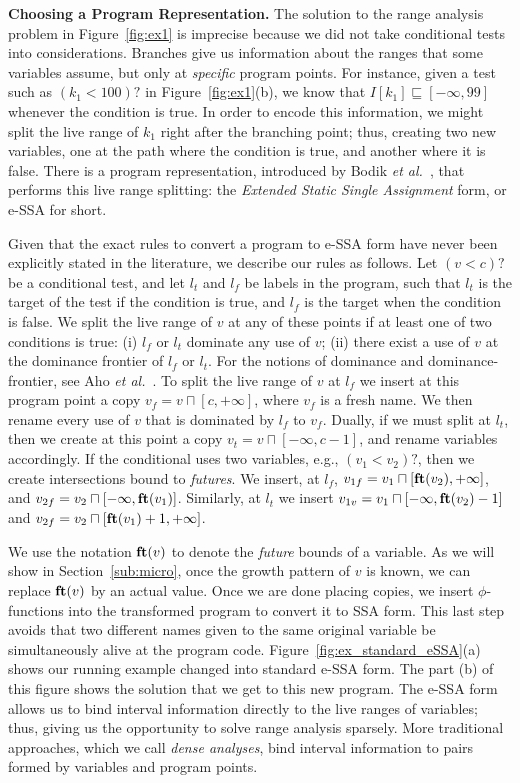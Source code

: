 \documentclass{llncs}
\newcommand{\fun}[1]{\mbox{\textbf{#1}}}
\begin{document}
\noindent
\textbf{Choosing a Program Representation.}
The solution to the range analysis problem in Figure~\ref{fig:ex1}
is imprecise because we did not take conditional tests into considerations.
Branches give us information about the ranges that some variables assume, but
only at {\em specific} program points.
For instance, given a test such as $(k_1 < 100)?$ in  Figure~\ref{fig:ex1}(b),
we know that $I[k_1] \sqsubseteq [-\infty, 99]$ whenever the condition is true.
In order to encode this information, we might split the live range of $k_1$
right after the branching point; thus, creating two new variables, one at the
path where the condition is true, and another where it is false.
There is a program representation, introduced by Bodik
{\em et al.}~\cite{Bodik00}, that performs this live range splitting:
the {\em Extended Static Single Assignment} form, or e-SSA for short.

Given that the exact rules to convert a program to e-SSA form have never been
explicitly stated in the literature, we describe our rules as follows.
Let $(v < c)?$ be a conditional test, and let $l_t$ and $l_f$ be labels in
the program, such that $l_t$ is the target of the test if the condition is true,
and $l_f$ is the target when the condition is false.
We split the live range of $v$ at any of these points if at least one of two
conditions is true:
(i) $l_f$ or $l_t$ dominate any use of $v$;
(ii) there exist a use of $v$ at the dominance frontier of $l_f$ or $l_t$.
For the notions of dominance and dominance-frontier, see Aho
{\em et al.}~\cite{Aho06}.
To split the live range of $v$ at $l_f$ we insert at this
program point a copy $v_f = v \sqcap [c, +\infty]$, where $v_f$ is a fresh name.
We then rename every use of $v$ that is dominated by $l_f$ to $v_f$.
Dually, if we must split at $l_t$, then we create at this point a copy
$v_t = v \sqcap [-\infty, c-1]$, and rename variables accordingly.
If the conditional uses two variables, e.g., $(v_1 < v_2)?$, then we create
intersections bound to {\em futures}.
We insert, at $l_f$, $v_{1f} = v_1 \sqcap [\fun{ft}(v_2), +\infty]$,
and $v_{2f} = v_2 \sqcap [-\infty, \fun{ft}(v_1)]$.
Similarly, at $l_t$ we insert
$v_{1v} = v_1 \sqcap [-\infty, \fun{ft}(v_2) - 1]$
and $v_{2f} = v_2 \sqcap [\fun{ft}(v_1) + 1, +\infty]$.

We use the notation $\fun{ft}(v)$ to denote the {\em future} bounds of a
variable.
As we will show in Section~\ref{sub:micro}, once the growth pattern of $v$ is
known, we can replace $\fun{ft}(v)$ by an actual value.
Once we are done placing copies, we insert $\phi$-functions into the
transformed program to convert it to SSA form.
This last step avoids that two different names given to the same original
variable be simultaneously alive at the program code.
Figure~\ref{fig:ex_standard_eSSA}(a) shows our running example changed into
standard e-SSA form.
The part (b) of this figure shows the solution that we get to this new
program.
The e-SSA form allows us to bind interval information directly to the live
ranges of variables; thus, giving us the opportunity to solve range analysis
sparsely.
More traditional approaches, which we call {\em dense analyses}, bind
interval information to pairs formed by variables and program points.
\end{document}
